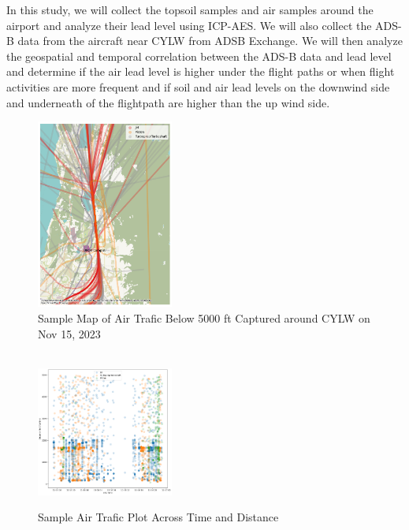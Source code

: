 \documentclass[12pt]{article}
\begin{document}
In this study, we will collect the topsoil samples and air samples around the airport and analyze their lead level using ICP-AES. We will also collect the ADS-B data from the aircraft near CYLW from ADSB Exchange\cite{adsbexchange}. We will then analyze the geospatial and temporal correlation between the ADS-B data and lead level and determine if the air lead level is higher under the flight paths or when flight activities are more frequent and if soil and air lead levels on the downwind side and underneath of the flightpath are higher than the up wind side. 
\setlength\intextsep{-2pt}
\begin{figure}
  \begin{center}
    \includegraphics[width=0.4\textwidth]{map.png} \\
  \caption{\small{Sample Map of Air Trafic Below 5000 ft Captured around CYLW on Nov 15, 2023}}
      \label{fig:map}\\

          \includegraphics[width=0.4\textwidth]{time.png} \\
  \caption{\small{Sample Air Trafic Plot Across Time and Distance}}
      \label{fig:time}
  \end{center}
\vspace{-20pt}
\end{figure}
\end{document}
